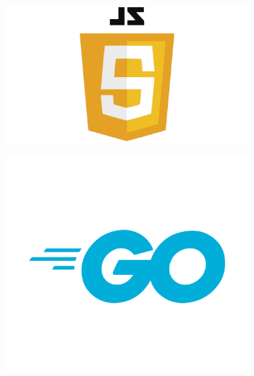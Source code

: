 \begin{figure}[h!]
  \begin{subfigure}[b]{0.25\textwidth}
    \includegraphics[width=\textwidth]{Images/JavaScript-Logo.png}
    \label{fig:javascript}
  \end{subfigure}
  \hfill
  \begin{subfigure}[b]{0.2\textwidth}
    \includegraphics[width=\textwidth]{Images/Go-Logo_Blue.png}
    \label{fig:golang}
  \end{subfigure}
  \hfill
  \begin{subfigure}[b]{0.15\textwidth}

\end{subfigure}
\end{figure}
